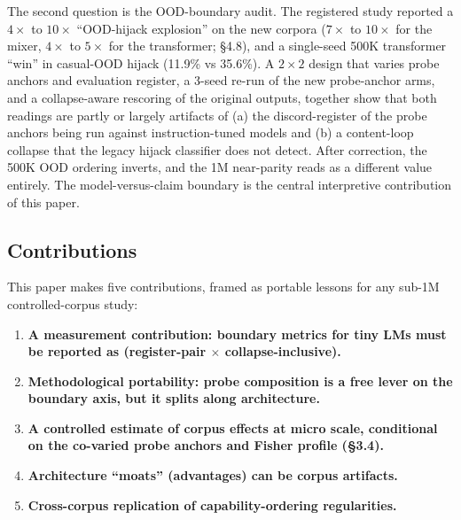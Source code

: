 \documentclass[11pt]{article}
\begin{document}
The second question is the OOD-boundary audit. The registered study reported a $4\times$ to $10\times$ ``OOD-hijack explosion'' on the new corpora ($7\times$ to $10\times$ for the mixer, $4\times$ to $5\times$ for the transformer; \S4.8), and a single-seed 500K transformer ``win'' in casual-OOD hijack (11.9\% vs 35.6\%). A $2\times 2$ design that varies probe anchors and evaluation register, a 3-seed re-run of the new probe-anchor arms, and a collapse-aware rescoring of the original outputs, together show that both readings are partly or largely artifacts of (a) the discord-register of the probe anchors being run against instruction-tuned models and (b) a content-loop collapse that the legacy hijack classifier does not detect. After correction, the 500K OOD ordering inverts, and the 1M near-parity reads as a different value entirely. The model-versus-claim boundary is the central interpretive contribution of this paper.

\subsection{Contributions}

This paper makes five contributions, framed as portable lessons for any sub-1M controlled-corpus study:

\begin{enumerate}


  \item \textbf{A measurement contribution: boundary metrics for tiny LMs must be reported as (register-pair $\times$ collapse-inclusive).}

  \item \textbf{Methodological portability: probe composition is a free lever on the boundary axis, but it splits along architecture.}

  \item \textbf{A controlled estimate of corpus effects at micro scale, conditional on the co-varied probe anchors and Fisher profile (\S3.4).}

  \item \textbf{Architecture ``moats'' (advantages) can be corpus artifacts.}

  \item \textbf{Cross-corpus replication of capability-ordering regularities.}
\end{enumerate}
\end{document}
